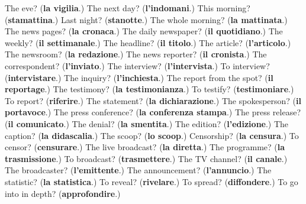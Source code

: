 \begin{tcolorbox}[breakable,colback=teal!4,colframe=teal!35!black,title={Before you move on}]
The eve? (\textbf{la vigilia}.) The next day? (\textbf{l'indomani}.) This morning? (\textbf{stamattina}.) Last night? (\textbf{stanotte}.) The whole morning? (\textbf{la mattinata}.) The news pages? (\textbf{la cronaca}.) The daily newspaper? (\textbf{il quotidiano}.) The weekly? (\textbf{il settimanale}.) The headline? (\textbf{il titolo}.) The article? (\textbf{l'articolo}.) The newsroom? (\textbf{la redazione}.) The news reporter? (\textbf{il cronista}.) The correspondent? (\textbf{l'inviato}.) The interview? (\textbf{l'intervista}.) To interview? (\textbf{intervistare}.) The inquiry? (\textbf{l'inchiesta}.) The report from the spot? (\textbf{il reportage}.) The testimony? (\textbf{la testimonianza}.) To testify? (\textbf{testimoniare}.) To report? (\textbf{riferire}.) The statement? (\textbf{la dichiarazione}.) The spokesperson? (\textbf{il portavoce}.) The press conference? (\textbf{la conferenza stampa}.) The press release? (\textbf{il comunicato}.) The denial? (\textbf{la smentita}.) The edition? (\textbf{l'edizione}.) The caption? (\textbf{la didascalia}.) The scoop? (\textbf{lo scoop}.) Censorship? (\textbf{la censura}.) To censor? (\textbf{censurare}.) The live broadcast? (\textbf{la diretta}.) The programme? (\textbf{la trasmissione}.) To broadcast? (\textbf{trasmettere}.) The TV channel? (\textbf{il canale}.) The broadcaster? (\textbf{l'emittente}.) The announcement? (\textbf{l'annuncio}.) The statistic? (\textbf{la statistica}.) To reveal? (\textbf{rivelare}.) To spread? (\textbf{diffondere}.) To go into in depth? (\textbf{approfondire}.)
\end{tcolorbox}
